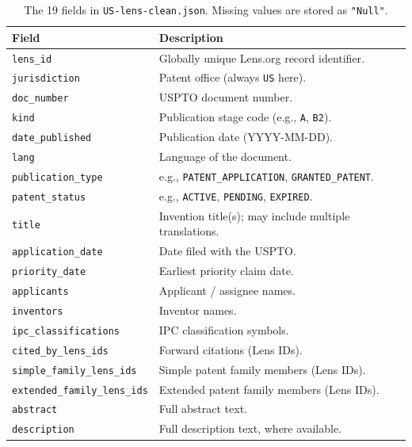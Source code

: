 \documentclass[11pt]{article}
\begin{document}
\begin{table}[H]
  \centering
  \small
  \begin{tabular}{p{4.8cm} p{7.5cm}}
    \toprule
    \textbf{Field} & \textbf{Description} \\
    \midrule
    \texttt{lens\_id}                    & Globally unique Lens.org record identifier. \\
    \texttt{jurisdiction}                & Patent office (always \texttt{US} here). \\
    \texttt{doc\_number}                 & USPTO document number. \\
    \texttt{kind}                        & Publication stage code (e.g., \texttt{A}, \texttt{B2}). \\
    \texttt{date\_published}             & Publication date (YYYY-MM-DD). \\
    \texttt{lang}                        & Language of the document. \\
    \texttt{publication\_type}           & e.g., \texttt{PATENT\_APPLICATION}, \texttt{GRANTED\_PATENT}. \\
    \texttt{patent\_status}              & e.g., \texttt{ACTIVE}, \texttt{PENDING}, \texttt{EXPIRED}. \\
    \texttt{title}                       & Invention title(s); may include multiple translations. \\
    \texttt{application\_date}           & Date filed with the USPTO. \\
    \texttt{priority\_date}              & Earliest priority claim date. \\
    \texttt{applicants}                  & Applicant / assignee names. \\
    \texttt{inventors}                   & Inventor names. \\
    \texttt{ipc\_classifications}        & IPC classification symbols. \\
    \texttt{cited\_by\_lens\_ids}        & Forward citations (Lens IDs). \\
    \texttt{simple\_family\_lens\_ids}   & Simple patent family members (Lens IDs). \\
    \texttt{extended\_family\_lens\_ids} & Extended patent family members (Lens IDs). \\
    \texttt{abstract}                    & Full abstract text. \\
    \texttt{description}                 & Full description text, where available. \\
    \bottomrule
  \end{tabular}
  \caption{The 19 fields in \texttt{US-lens-clean.json}. Missing values are stored as \texttt{"Null"}.}
  \label{tab:lens_schema}
\end{table}
\end{document}
